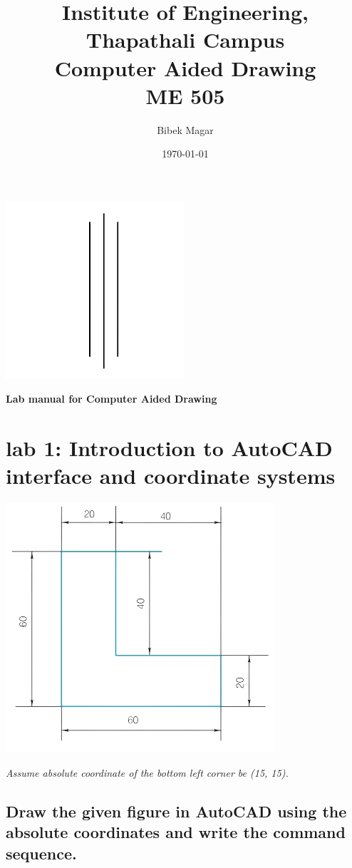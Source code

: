 \documentclass[a4paper, 12pt]{article}
\title{Institute of Engineering,\\ Thapathali Campus \\ Computer Aided Drawing \\ ME 505} %
\author{Bibek Magar}
\date{\today} %
\begin{document}
\maketitle %
	\begin{center}
		\includegraphics{gfx/lines.png}
	\end{center}
	\begin{center}
		\textbf{Lab manual for Computer Aided Drawing}
	\end{center}
	
	\newpage
\section{lab 1: Introduction to AutoCAD interface and coordinate systems}
\begin{center}
	\includegraphics{gfx/fig.png}
\end{center}
\emph{Assume absolute coordinate of the bottom left corner be (15, 15).}
\subsection{Draw the given figure in AutoCAD using the absolute coordinates and write the command sequence.}
\end{document}
